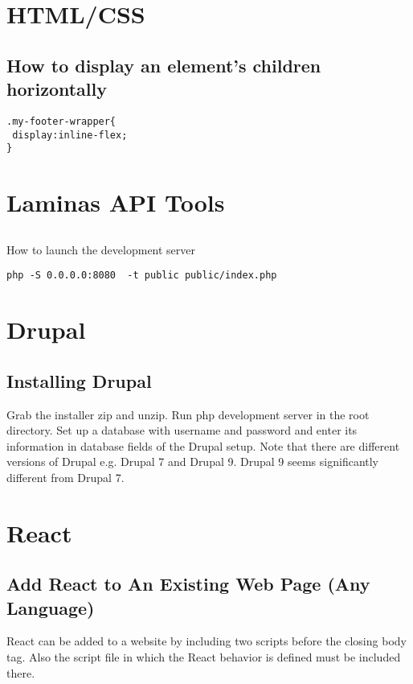 \documentclass{article}
\begin{document}
\section{HTML/CSS}
\subsection{How to display an element's children horizontally}
\begin{lstlisting}
.my-footer-wrapper{
 display:inline-flex;
}
\end{lstlisting}

\section*{Laminas API Tools}
\subsection*{}{How to launch the development server}
\begin{lstlisting}
php -S 0.0.0.0:8080  -t public public/index.php
\end{lstlisting}

\section{Drupal}

\subsection{Installing Drupal}
Grab the installer zip and unzip. Run php development server in the root directory. Set up a database with username and password and enter its information in database fields of the Drupal setup. Note that there are different versions of Drupal e.g. Drupal 7 and Drupal 9. Drupal 9 seems significantly different from Drupal 7. 

\section{React}
\subsection{Add React to An Existing Web Page (Any Language)}
React can be added to a website by including two scripts before the closing body tag. Also the script file in which the React behavior is defined must be included there. 
\end{document}
